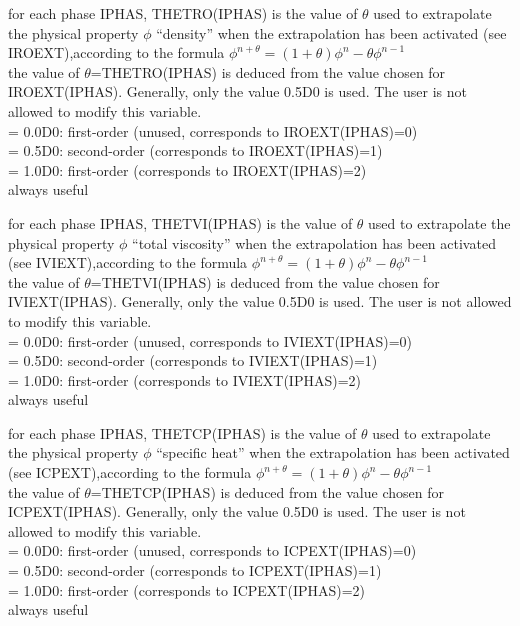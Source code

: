 {for each phase IPHAS, THETRO(IPHAS) is the value of $\theta$ used to
extrapolate the physical property $\phi$ ``density'' when the extrapolation has
been activated (see IROEXT),according to the
formula $\phi^{n+\theta}=(1+\theta)\phi^n-\theta \phi^{n-1}$\\
the value of $\theta$=THETRO(IPHAS) is deduced from the value chosen for
IROEXT(IPHAS). Generally, only the value 0.5D0 is used. The user is not
allowed to modify this variable.\\
\hspace*{1.3cm}= 0.0D0: first-order (unused, corresponds to
IROEXT(IPHAS)=0)\\ 
\hspace*{1.3cm}= 0.5D0: second-order (corresponds to IROEXT(IPHAS)=1) \\
\hspace*{1.3cm}= 1.0D0: first-order (corresponds to IROEXT(IPHAS)=2) \\
always useful}

{for each phase IPHAS, THETVI(IPHAS) is the value of $\theta$ used to
extrapolate the physical property $\phi$ ``total viscosity'' when the extrapolation has
been activated (see IVIEXT),according to the
formula $\phi^{n+\theta}=(1+\theta)\phi^n-\theta \phi^{n-1}$\\
the value of $\theta$=THETVI(IPHAS) is deduced from the value chosen for
IVIEXT(IPHAS). Generally, only the value 0.5D0 is used. The user is not
allowed to modify this variable.\\
\hspace*{1.3cm}= 0.0D0: first-order (unused, corresponds to
IVIEXT(IPHAS)=0)\\ 
\hspace*{1.3cm}= 0.5D0: second-order (corresponds to IVIEXT(IPHAS)=1) \\
\hspace*{1.3cm}= 1.0D0: first-order (corresponds to IVIEXT(IPHAS)=2) \\
always useful}

{for each phase IPHAS, THETCP(IPHAS) is the value of $\theta$ used to
extrapolate the physical property $\phi$ ``specific heat'' when the extrapolation has
been activated (see ICPEXT),according to the
formula $\phi^{n+\theta}=(1+\theta)\phi^n-\theta \phi^{n-1}$\\
the value of $\theta$=THETCP(IPHAS) is deduced from the value chosen for
ICPEXT(IPHAS). Generally, only the value 0.5D0 is used. The user is not
allowed to modify this variable.\\
\hspace*{1.3cm}= 0.0D0: first-order (unused, corresponds to
ICPEXT(IPHAS)=0)\\ 
\hspace*{1.3cm}= 0.5D0: second-order (corresponds to ICPEXT(IPHAS)=1) \\
\hspace*{1.3cm}= 1.0D0: first-order (corresponds to ICPEXT(IPHAS)=2) \\
always useful}

